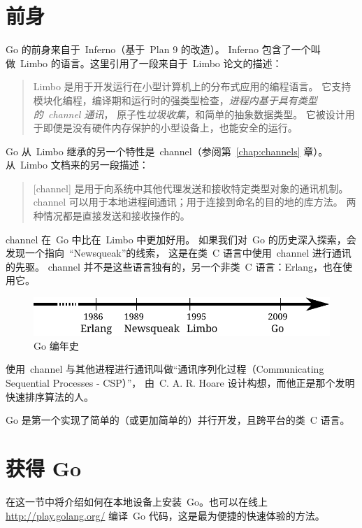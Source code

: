 \section{前身}
Go 的前身来自于~Inferno\cite{inferno}（基于~Plan 9\cite{plan9} 的改造）。
Inferno 包含了一个叫做~Limbo\cite{limbo} 的语言。这里引用了一段来自于~Limbo 论文的描述：
\begin{quote}
Limbo 是用于开发运行在小型计算机上的分布式应用的编程语言。
它支持模块化编程，编译期和运行时的强类型检查，\emph{进程内基于具有类型的~channel 通讯}，
原子性\emph{垃圾收集}，和简单的抽象数据类型。
它被设计用于即便是没有硬件内存保护的小型设备上，也能安全的运行。
\end{quote}
Go 从~Limbo 继承的另一个特性是~channel（参阅第~\ref{chap:channels} 章）。
从~Limbo 文档来的另一段描述：
\begin{quote}
[channel] 是用于向系统中其他代理发送和接收特定类型对象的通讯机制。
channel 可以用于本地进程间通讯；用于连接到命名的目的地的库方法。
两种情况都是直接发送和接收操作的。
\end{quote}
channel 在~Go 中比在~Limbo 中更加好用。
如果我们对~Go 的历史深入探索，会发现一个指向~``Newsqueak\cite{newsqueak}''的线索，
这是在类~C 语言中使用~channel 进行通讯的先驱。
channel 并不是这些语言独有的，另一个非类~C 语言：Erlang\cite{erlang}，也在使用它。

\begin{figure}[H]
\caption{Go 编年史}
\label{fig:chrono-of-go}
\begin{center}
\includegraphics[scale=0.65]{fig/go-history.pdf}
\end{center}
\end{figure}

使用~channel 与其他进程进行通讯叫做``通讯序列化过程（Communicating Sequential Processes - CSP）''，
由~C. A. R. Hoare\cite{hoare} 设计构想，而他正是那个发明快速排序\cite{quicksort}算法的人。

\begin{lbar}[]
Go 是第一个实现了简单的（或更加简单的）并行开发，且跨平台的类~C 语言。
\end{lbar}

\section{获得 Go}
在这一节中将介绍如何在本地设备上安装~Go。也可以在线上 \url{http://play.golang.org/} 编译~Go 代码，这是最为便捷的快速体验的方法。

